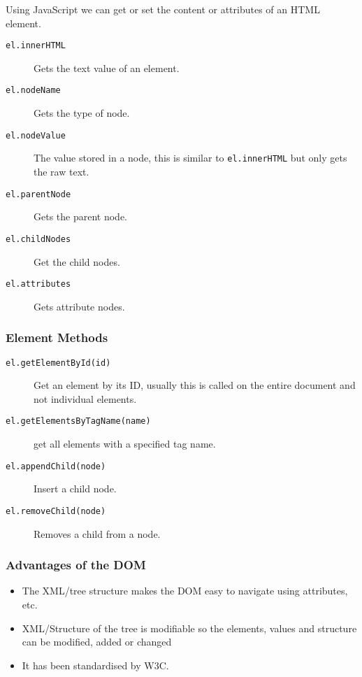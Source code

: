 Using JavaScript we can get or set the content or attributes of an HTML element.
\begin{description}
	\item[\texttt{el.innerHTML}] Gets the text value of an element.
	\item [\texttt{el.nodeName}] Gets the type of node.
	\item[\texttt{el.nodeValue}] The value stored in a node, this is similar to \texttt{el.innerHTML} but only gets the raw text.
	\item[\texttt{el.parentNode}] Gets the parent node.
	\item[\texttt{el.childNodes}] Get the child nodes.
	\item[\texttt{el.attributes}] Gets attribute nodes.
\end{description}

\subsubsection{Element Methods}\label{ssub:element_methods}

\begin{description}
	\item[\texttt{el.getElementById(id)}] Get an element by its ID, usually this is called on the entire document and not individual elements.
	\item[\texttt{el.getElementsByTagName(name)}] get all elements with a specified tag name.
	\item[\texttt{el.appendChild(node)}] Insert a child node.
	\item[\texttt{el.removeChild(node)}] Removes a child from a node.
\end{description}

\subsubsection{Advantages of the DOM}\label{ssub:advantages_of_the_dom}

\begin{itemize}
	\item The XML/tree structure makes the DOM easy to navigate using attributes, etc.
	\item XML/Structure of the tree is modifiable so the elements, values and structure can be modified, added or changed
	\item It has been standardised by W3C.
\end{itemize}

